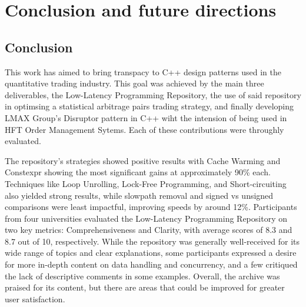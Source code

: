 \documentclass{article}
\theoremstyle{break}
\begin{document}
\section{Conclusion and future directions}
\subsection*{Conclusion}
This work has aimed to bring transpacy to C++ design patterns used in the quantitative trading industry. This goal was achieved by the main three deliverables, the Low-Latency Programming Repository, the use of said repository in optimsing a statistical arbitrage pairs trading strategy, and finally developing LMAX Group's Disruptor pattern in C++ wiht the intension of being used in HFT Order Management Sytems. Each of these contributions were throughly evaluated. 

The repository's strategies showed positive results with Cache Warming and Constexpr showing the most significant gains at approximately 90\% each. Techniques like Loop Unrolling, Lock-Free Programming, and Short-circuiting also yielded strong results, while slowpath removal and signed vs unsigned comparisons were least impactful, improving speeds by around 12\%. Participants from four universities evaluated the Low-Latency Programming Repository on two key metrics: Comprehensiveness and Clarity, with average scores of 8.3 and 8.7 out of 10, respectively. While the repository was generally well-received for its wide range of topics and clear explanations, some participants expressed a desire for more in-depth content on data handling and concurrency, and a few critiqued the lack of descriptive comments in some examples. Overall, the archive was praised for its content, but there are areas that could be improved for greater user satisfaction.
\end{document}

